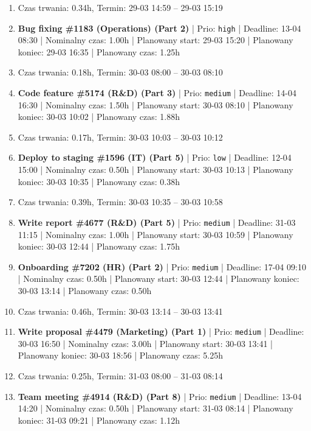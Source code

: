 {\begin{enumerate}
  \item [\textbf{PRZERWA}] Czas trwania: 0.34h, Termin: 29-03 14:59 -- 29-03 15:19
  \item [\textbf{14613}] \textbf{Bug fixing \#1183 (Operations) (Part 2)} | Prio: \texttt{high} | Deadline: 13-04 08:30 | Nominalny czas: 1.00h | Planowany start: 29-03 15:20 | Planowany koniec: 29-03 16:35 | Planowany czas: 1.25h
  \item [\textbf{PRZERWA}] Czas trwania: 0.18h, Termin: 30-03 08:00 -- 30-03 08:10
  \item [\textbf{14646}] \textbf{Code feature \#5174 (R\&D) (Part 3)} | Prio: \texttt{medium} | Deadline: 14-04 16:30 | Nominalny czas: 1.50h | Planowany start: 30-03 08:10 | Planowany koniec: 30-03 10:02 | Planowany czas: 1.88h
  \item [\textbf{PRZERWA}] Czas trwania: 0.17h, Termin: 30-03 10:03 -- 30-03 10:12
  \item [\textbf{14692}] \textbf{Deploy to staging \#1596 (IT) (Part 5)} | Prio: \texttt{low} | Deadline: 12-04 15:00 | Nominalny czas: 0.50h | Planowany start: 30-03 10:13 | Planowany koniec: 30-03 10:35 | Planowany czas: 0.38h
  \item [\textbf{PRZERWA}] Czas trwania: 0.39h, Termin: 30-03 10:35 -- 30-03 10:58
  \item [\textbf{14640}] \textbf{Write report \#4677 (R\&D) (Part 5)} | Prio: \texttt{medium} | Deadline: 31-03 11:15 | Nominalny czas: 1.00h | Planowany start: 30-03 10:59 | Planowany koniec: 30-03 12:44 | Planowany czas: 1.75h
  \item [\textbf{14648}] \textbf{Onboarding \#7202 (HR) (Part 2)} | Prio: \texttt{medium} | Deadline: 17-04 09:10 | Nominalny czas: 0.50h | Planowany start: 30-03 12:44 | Planowany koniec: 30-03 13:14 | Planowany czas: 0.50h
  \item [\textbf{PRZERWA}] Czas trwania: 0.46h, Termin: 30-03 13:14 -- 30-03 13:41
  \item [\textbf{14660}] \textbf{Write proposal \#4479 (Marketing) (Part 1)} | Prio: \texttt{medium} | Deadline: 30-03 16:50 | Nominalny czas: 3.00h | Planowany start: 30-03 13:41 | Planowany koniec: 30-03 18:56 | Planowany czas: 5.25h
  \item [\textbf{PRZERWA}] Czas trwania: 0.25h, Termin: 31-03 08:00 -- 31-03 08:14
  \item [\textbf{14638}] \textbf{Team meeting \#4914 (R\&D) (Part 8)} | Prio: \texttt{medium} | Deadline: 13-04 14:20 | Nominalny czas: 0.50h | Planowany start: 31-03 08:14 | Planowany koniec: 31-03 09:21 | Planowany czas: 1.12h

\end{enumerate}}
